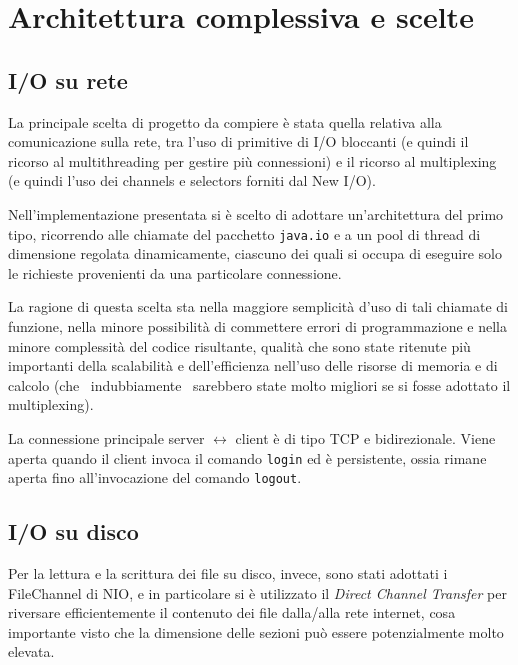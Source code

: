 \documentclass[a4paper,12pt]{article}
\begin{document}
 
 \section{ Architettura complessiva e scelte }
 
 \subsection*{ I/O su rete }
  La principale scelta di progetto da compiere è stata quella relativa alla comunicazione sulla rete, tra l'uso di primitive di I/O bloccanti (e quindi il ricorso al multithreading per gestire più connessioni) e il ricorso al multiplexing (e quindi l'uso dei channels e selectors forniti dal New I/O).
  
  Nell'implementazione presentata si è scelto di adottare un'architettura del primo tipo, ricorrendo alle chiamate del pacchetto \texttt{java.io} e a un pool di thread di dimensione regolata dinamicamente, ciascuno dei quali si occupa di eseguire solo le richieste provenienti da una particolare connessione.
  
  La ragione di questa scelta sta nella maggiore semplicità d'uso di tali chiamate di funzione, nella minore possibilità di commettere errori di programmazione e nella minore complessità del codice risultante, qualità che sono state ritenute più importanti della scalabilità e dell'efficienza nell'uso delle risorse di memoria e di calcolo (che \textendash\ indubbiamente \textendash\ sarebbero state molto migliori se si fosse adottato il multiplexing).
  
  La connessione principale server $\leftrightarrow$ client è di tipo TCP e bidirezionale. Viene aperta quando il client invoca il comando \texttt{login} ed è persistente, ossia rimane aperta fino all'invocazione del comando \texttt{logout}.
 
 \subsection*{ I/O su disco }
 Per la lettura e la scrittura dei file su disco, invece, sono stati adottati i FileChannel di NIO, e in particolare si è utilizzato il \textit{Direct Channel Transfer} per riversare efficientemente il contenuto dei file dalla/alla rete internet, cosa importante visto che la dimensione delle sezioni può essere potenzialmente molto elevata.
 
\end{document}
